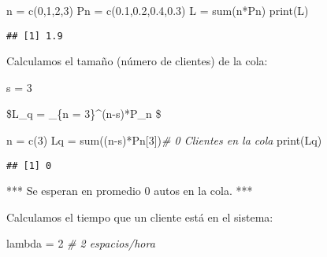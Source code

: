 \documentclass[
]{article}
\newenvironment{Shaded}{\begin{snugshade}}{\end{snugshade}}
\newcommand{\CommentTok}[1]{\textcolor[rgb]{0.56,0.35,0.01}{\textit{#1}}}
\newcommand{\DecValTok}[1]{\textcolor[rgb]{0.00,0.00,0.81}{#1}}
\newcommand{\FloatTok}[1]{\textcolor[rgb]{0.00,0.00,0.81}{#1}}
\newcommand{\FunctionTok}[1]{\textcolor[rgb]{0.00,0.00,0.00}{#1}}
\newcommand{\NormalTok}[1]{#1}
\newcommand{\OtherTok}[1]{\textcolor[rgb]{0.56,0.35,0.01}{#1}}
\newcommand{\SpecialCharTok}[1]{\textcolor[rgb]{0.00,0.00,0.00}{#1}}
\begin{document}
\begin{Shaded}
\begin{Highlighting}[]
\NormalTok{n }\OtherTok{=} \FunctionTok{c}\NormalTok{(}\DecValTok{0}\NormalTok{,}\DecValTok{1}\NormalTok{,}\DecValTok{2}\NormalTok{,}\DecValTok{3}\NormalTok{)}
\NormalTok{Pn }\OtherTok{=} \FunctionTok{c}\NormalTok{(}\FloatTok{0.1}\NormalTok{,}\FloatTok{0.2}\NormalTok{,}\FloatTok{0.4}\NormalTok{,}\FloatTok{0.3}\NormalTok{)}
\NormalTok{L }\OtherTok{=} \FunctionTok{sum}\NormalTok{(n}\SpecialCharTok{*}\NormalTok{Pn)}
\FunctionTok{print}\NormalTok{(L)}
\end{Highlighting}
\end{Shaded}

\begin{verbatim}
## [1] 1.9
\end{verbatim}

Calculamos el tamaño (número de clientes) de la cola:

\begin{Shaded}
\begin{Highlighting}[]
\NormalTok{s }\OtherTok{=} \DecValTok{3}
\end{Highlighting}
\end{Shaded}

\$L\_q = \displaystyle\sum\_\{n = 3\}\^{}\infty (n-s)*P\_n \$

\begin{Shaded}
\begin{Highlighting}[]
\NormalTok{n }\OtherTok{=} \FunctionTok{c}\NormalTok{(}\DecValTok{3}\NormalTok{)}
\NormalTok{Lq }\OtherTok{=} \FunctionTok{sum}\NormalTok{((n}\SpecialCharTok{{-}}\NormalTok{s)}\SpecialCharTok{*}\NormalTok{Pn[}\DecValTok{3}\NormalTok{])}\CommentTok{\# 0 Clientes en la cola}
\FunctionTok{print}\NormalTok{(Lq)}
\end{Highlighting}
\end{Shaded}

\begin{verbatim}
## [1] 0
\end{verbatim}

*** Se esperan en promedio 0 autos en la cola. ***

Calculamos el tiempo que un cliente está en el sistema:

\begin{Shaded}
\begin{Highlighting}[]
\NormalTok{lambda }\OtherTok{=} \DecValTok{2} \CommentTok{\# 2 espacios/hora}
\end{Highlighting}
\end{Shaded}
\end{document}

